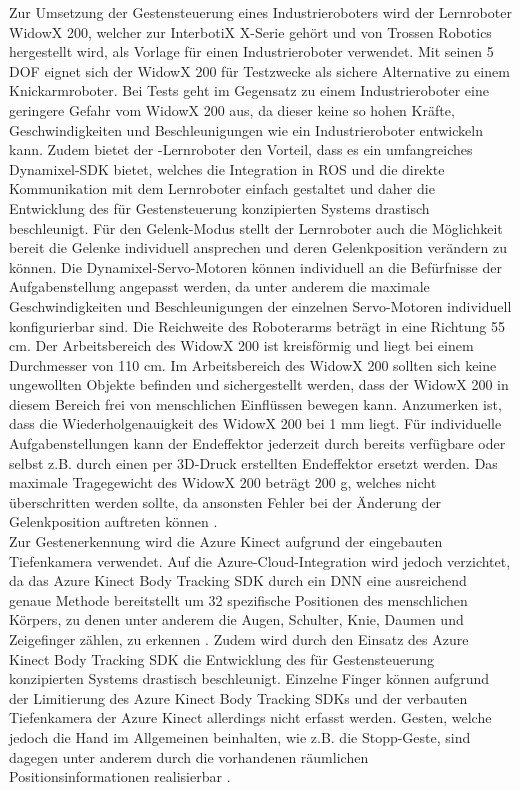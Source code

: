 Zur Umsetzung der Gestensteuerung eines Industrieroboters wird der Lernroboter WidowX 200, welcher zur InterbotiX X-Serie gehört und von Trossen Robotics hergestellt wird, als Vorlage für einen Industrieroboter verwendet. Mit seinen 5 DOF eignet sich der WidowX 200 für Testzwecke als sichere Alternative zu einem Knickarmroboter. Bei Tests geht im Gegensatz zu einem Industrieroboter eine geringere Gefahr vom WidowX 200 aus, da dieser keine so hohen Kräfte, Geschwindigkeiten und Beschleunigungen wie ein Industrieroboter entwickeln kann. Zudem bietet der -Lernroboter den Vorteil, dass es ein umfangreiches Dynamixel-SDK bietet, welches die Integration in ROS und die direkte Kommunikation mit dem Lernroboter einfach gestaltet und daher die Entwicklung des für Gestensteuerung konzipierten Systems drastisch beschleunigt. Für den Gelenk-Modus stellt der Lernroboter auch die Möglichkeit bereit die Gelenke individuell ansprechen und deren Gelenkposition verändern zu können. Die Dynamixel-Servo-Motoren können individuell an die Befürfnisse der Aufgabenstellung angepasst werden, da unter anderem die maximale Geschwindigkeiten und Beschleunigungen der einzelnen Servo-Motoren individuell konfigurierbar sind. Die Reichweite des Roboterarms beträgt in eine Richtung \num{55} cm. Der Arbeitsbereich des WidowX 200 ist kreisförmig und liegt bei einem Durchmesser von \num{110} cm. Im Arbeitsbereich des WidowX 200 sollten sich keine ungewollten Objekte befinden und sichergestellt werden, dass der WidowX 200 in diesem Bereich frei von menschlichen Einflüssen bewegen kann. Anzumerken ist, dass die Wiederholgenauigkeit des WidowX 200 bei \num{1} mm liegt. Für individuelle Aufgabenstellungen kann der Endeffektor jederzeit durch bereits verfügbare oder selbst z.B. durch einen per 3D-Druck erstellten Endeffektor ersetzt werden. Das maximale Tragegewicht des WidowX 200 beträgt 200 g, welches nicht überschritten werden sollte, da ansonsten Fehler bei der Änderung der Gelenkposition auftreten können \cite{widowx_200_nodate}.\\

Zur Gestenerkennung wird die Azure Kinect aufgrund der eingebauten Tiefenkamera verwendet. Auf die Azure-Cloud-Integration wird jedoch verzichtet, da das Azure Kinect Body Tracking SDK durch ein DNN eine ausreichend genaue Methode bereitstellt \cite{qm13_azure_kinect_release_notes_nodate} um 32 spezifische Positionen des menschlichen Körpers, zu denen unter anderem die Augen, Schulter, Knie, Daumen und Zeigefinger zählen, zu erkennen \cite{qm13_azure_joints_nodate}. Zudem wird durch den Einsatz des Azure Kinect Body Tracking SDK die Entwicklung des für Gestensteuerung konzipierten Systems drastisch beschleunigt. Einzelne Finger können aufgrund der Limitierung des Azure Kinect Body Tracking SDKs und der verbauten Tiefenkamera der Azure Kinect allerdings nicht erfasst werden. Gesten, welche jedoch die Hand im Allgemeinen beinhalten, wie z.B. die Stopp-Geste, sind dagegen unter anderem durch die vorhandenen räumlichen Positionsinformationen realisierbar \cite{microsoftazure-kinect-sensor-sdk_2020}.\\

